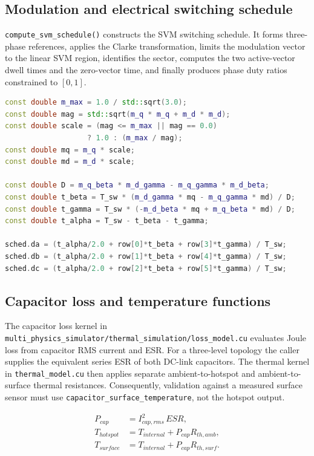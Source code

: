 \documentclass{article}
\begin{document}
\subsection{Modulation and electrical switching schedule}
\label{sec:implementation-modulation}
\texttt{compute\_svm\_schedule()} constructs the SVM switching schedule.  It
forms three-phase references, applies the Clarke transformation, limits the
modulation vector to the linear SVM region, identifies the sector, computes the
two active-vector dwell times and the zero-vector time, and finally produces
phase duty ratios constrained to $[0,1]$.

\begin{lstlisting}[language=C++,caption={Core SVM dwell-time and duty-ratio calculation}]
const double m_max = 1.0 / std::sqrt(3.0);
const double mag = std::sqrt(m_q * m_q + m_d * m_d);
const double scale = (mag <= m_max || mag == 0.0)
                   ? 1.0 : (m_max / mag);
const double mq = m_q * scale;
const double md = m_d * scale;

const double D = m_q_beta * m_d_gamma - m_q_gamma * m_d_beta;
const double t_beta = T_sw * (m_d_gamma * mq - m_q_gamma * md) / D;
const double t_gamma = T_sw * (-m_d_beta * mq + m_q_beta * md) / D;
const double t_alpha = T_sw - t_beta - t_gamma;

sched.da = (t_alpha/2.0 + row[0]*t_beta + row[3]*t_gamma) / T_sw;
sched.db = (t_alpha/2.0 + row[1]*t_beta + row[4]*t_gamma) / T_sw;
sched.dc = (t_alpha/2.0 + row[2]*t_beta + row[5]*t_gamma) / T_sw;
\end{lstlisting}

\subsection{Capacitor loss and temperature functions}
\label{sec:implementation-capacitor-thermal}
The capacitor loss kernel in
\texttt{multi\_physics\_simulator/thermal\_simulation/loss\_model.cu} evaluates
Joule loss from capacitor RMS current and ESR.  For a three-level topology the
caller supplies the equivalent series ESR of both DC-link capacitors.  The
thermal kernel in \texttt{thermal\_model.cu} then applies separate
ambient-to-hotspot and ambient-to-surface thermal resistances.  Consequently,
validation against a measured surface sensor must use
\texttt{capacitor\_surface\_temperature}, not the hotspot output.

\begin{align}
P_{cap} &= I_{cap,rms}^{2}\,ESR, \\
T_{hotspot} &= T_{internal}+P_{cap}R_{th,amb}, \\
T_{surface} &= T_{internal}+P_{cap}R_{th,surf}.
\end{align}
\end{document}
